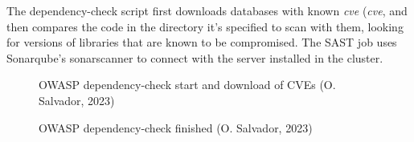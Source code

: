 \documentclass[11pt]{article}
\begin{document}
\begin{flushleft}
    The dependency-check script first downloads databases with known \textit{\acrshort{cve}} (\textit{\acrlong{cve}}, and then compares the code in the directory it's specified to scan with them, looking for versions of libraries that are known to be compromised. The SAST job uses Sonarqube's sonarscanner to connect with the server installed in the cluster.
    \linebreak


        \begin{figure}[htb]
            \centering
            \caption{OWASP dependency-check start and download of CVEs (O. Salvador, 2023)}
        \end{figure}

        \begin{figure}[htb]
            \centering
            \caption{OWASP dependency-check finished (O. Salvador, 2023)}
        \end{figure}


\end{flushleft}
\end{document}
